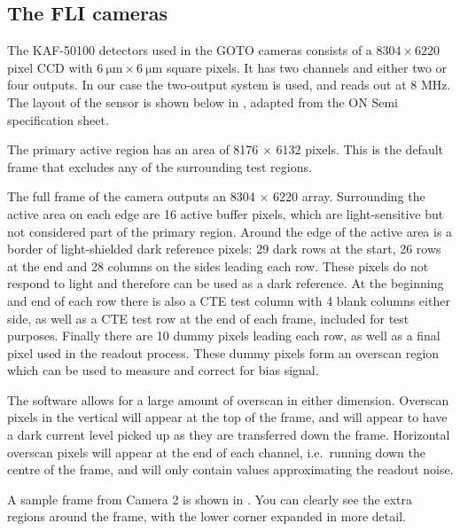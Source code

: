 \begin{colsection}
\begin{colsection}
\end{colsection}

\newpage
\subsection{The FLI cameras}
\label{sec:FLI}
\begin{colsection}

The KAF-50100 detectors used in the GOTO cameras consists of a $8304 \times 6220$ pixel CCD with $\SI{6}{\micro\metre} \times \SI{6}{\micro\metre}$ square pixels. It has two channels and either two or four outputs. In our case the two-output system is used, and reads out at 8 MHz. The layout of the sensor is shown below in , adapted from the ON Semi specification sheet.

The primary active region has an area of 8176 $\times$ 6132 pixels. This is the default frame that excludes any of the surrounding test regions.

The full frame of the camera outputs an 8304 $\times$ 6220 array. Surrounding the active area on each edge are 16 active buffer pixels, which are light-sensitive but not considered part of the primary region. Around the edge of the active area is a border of light-shielded dark reference pixels: 29 dark rows at the start, 26 rows at the end and 28 columns on the sides leading each row. These pixels do not respond to light and therefore can be used as a dark reference. At the beginning and end of each row there is also a CTE test column with 4 blank columns either side, as well as a CTE test row at the end of each frame, included for test purposes. Finally there are 10 dummy pixels leading each row, as well as a final pixel used in the readout process. These dummy pixels form an overscan region which can be used to measure and correct for bias signal.

The software allows for a large amount of overscan in either dimension. Overscan pixels in the vertical will appear at the top of the frame, and will appear to have a dark current level picked up as they are transferred down the frame. Horizontal overscan pixels will appear at the end of each channel, i.e.\ running down the centre of the frame, and will only contain values approximating the readout noise.

A sample frame from Camera 2 is shown in . You can clearly see the extra regions around the frame, with the lower corner expanded in more detail.


\end{colsection}
\end{colsection}
